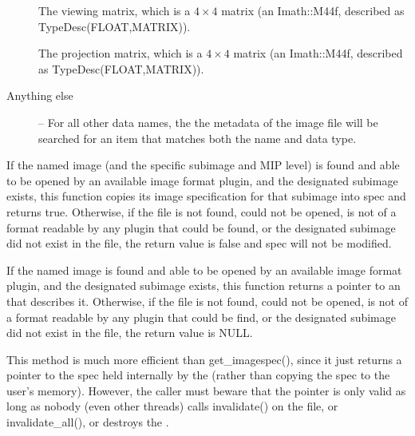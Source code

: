 \begin{description}
\item[\rm {}] The viewing matrix, which is a
$4 \times 4$ matrix (an {\cf Imath::M44f}, described as {\cf
  TypeDesc(FLOAT,MATRIX)}).

\item[\rm {}] The projection matrix, which is a
$4 \times 4$ matrix (an {\cf Imath::M44f}, described as {\cf
  TypeDesc(FLOAT,MATRIX)}).

\item[Anything else] -- For all other data names, the
the metadata of the image file will be searched for an item that
matches both the name and data type.

\end{description}
\apiend


If the named image (and the specific subimage and MIP level) is found and able to be opened by an available
image format plugin, and the designated subimage exists, this function copies
its image specification for that subimage into {\cf spec} and returns
{\cf true}.  Otherwise, if the file is not found, could not be opened,
is not of a format readable by any plugin that could be found, or
the designated subimage did not exist in the file, the return value is
{\cf false} and {\cf spec} will not be modified.

\apiend


If the named image is found and able to be opened by an available
image format plugin, and the designated subimage exists, this function
returns a pointer to an \ImageSpec that describes it.  Otherwise, if the
file is not found, could not be opened, is not of a format readable by
any plugin that could be find, or the designated subimage did
not exist in the file, the return value is NULL.

This method is much more efficient than {\cf get_imagespec()}, since it
just returns a pointer to the spec held internally by the \ImageCache
(rather than copying the spec to the user's memory).  However, the
caller must beware that the pointer is only valid as long as nobody
(even other threads) calls {\cf invalidate()} on the file, or {\cf
  invalidate_all()}, or destroys the \ImageCache.
\apiend

